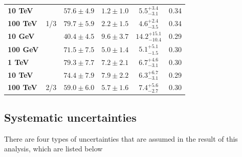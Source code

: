 \begin{table}[]
{\begin{tabular}{|l |c|c|c|c|c|}
\textbf{10 TeV} &  & $57.6\pm4.9$ & $1.2\pm1.0$ & $5.5^{ +3.4}_{ -3.1}$ & 0.34 \\ \cline{3-6}
\textbf{100 TeV} & \multirow{-5}{*}{1/3} & $79.7\pm5.9$ & $2.2\pm1.5$ & $ 4.6^{ +2.4}_{ -3.5}$ & 0.34 \\ \hline
\textbf{10 GeV} &  & $40.4\pm4.5$ & $9.6\pm3.7$ & $14.2^{ +15.1}_{ -10.4}$ & 0.29 \\ \cline{3-6}
\textbf{100 GeV} &  & $71.5\pm7.5$ & $5.0\pm1.4$ & $5.1^{ +5.1}_{ -1.5}$ & 0.30 \\ \cline{3-6}
\textbf{1 TeV} &  & $79.3\pm7.7$ & $7.2\pm2.1$ & $6.7^{ +4.6 }_{ -3.1}$ & 0.30 \\ \cline{3-6}
\textbf{10 TeV} &  & $74.4\pm7.9$ & $7.9\pm2.2$ & $6.3^{ +6.7}_{ -3.1}$ & 0.29 \\ \cline{3-6}
\textbf{100 TeV} & \multirow{-5}{*}{2/3} & $59.0\pm6.0$ & $5.7\pm1.6$ & ${ 7.4}^{ +5.6}_{ -2.7}$ & 0.30 \\ \hline
\end{tabular}%
}
\end{table}


\subsection{Systematic uncertainties}
There are four types of uncertainties that are assumed in the result of this analysis, which are listed below

